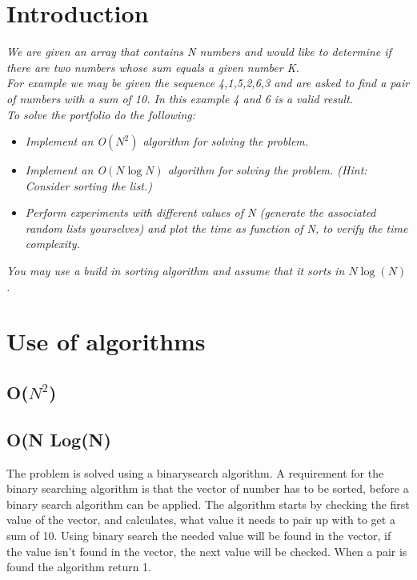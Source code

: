 \section{Introduction}
\emph{We are given an array that contains N numbers and would like to determine if there are two numbers whose sum equals a given number K.\\
For example we may be given the sequence 4,1,5,2,6,3 and are asked to find a pair of numbers with a sum of 10. In this example 4 and 6 is a valid result.\\
To solve the portfolio do the following:}
\begin{itemize}

\item \emph{Implement an O\(\left( { N }^{ 2 } \right)\) algorithm for solving the problem.}
\item \emph{Implement an O\(\left( N\log {N }  \right) \) algorithm for solving the problem. (Hint: Consider sorting the list.)}
\item \emph{Perform experiments with different values of \textit{N} (generate the associated random lists yourselves)
and plot the time as function of \textit{N}, to verify the time complexity.}
\end{itemize}
\emph{You may use a build in sorting algorithm and assume that it sorts in \( N\log {(N) }  \).}

\section{Use of algorithms}
\subsection{O(\(N^{2}\))}
\subsection{O(N Log(N)}
The problem is solved using a binarysearch algorithm. A requirement for the binary searching algorithm is that the vector of number has to be sorted, before a binary search algorithm can be applied. 
The algorithm starts by checking the first value of the vector, and calculates, what value it needs to pair up with to get a sum of 10.  Using binary search the needed value will be found in the vector, if the value isn't found in the vector, the next value will be checked.  When a pair is found the algorithm return 1. 
\\

